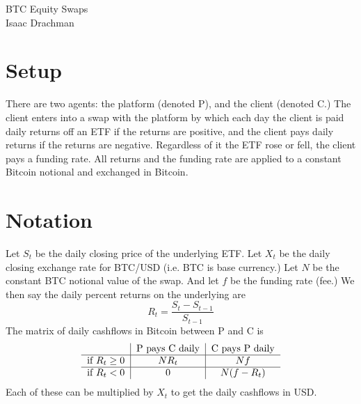 \documentclass[11pt]{report}
\begin{document}
\begingroup  
    \centering
    \Large BTC Equity Swaps\\
    \large Isaac Drachman\par
\endgroup

\section*{Setup}
    There are two agents: the platform (denoted P), and the client (denoted C.) The client
    enters into a swap with the platform by which each day the client is paid daily returns off an ETF
    if the returns are positive, and the client pays daily returns if the returns are negative. 
    Regardless of it the ETF rose or fell, the client pays a funding rate. All returns and the 
    funding rate are applied to a constant Bitcoin notional and exchanged in Bitcoin.
   
\section*{Notation}
    Let $S_t$ be the daily closing price of the underlying ETF. Let $X_t$ be the daily
    closing exchange rate for BTC/USD (i.e. BTC is base currency.) Let $N$ be the constant BTC 
    notional value of the swap. And let $f$ be the funding rate (fee.) We then say the daily
    percent returns on the underlying are
    \[
    R_t = \frac{S_t - S_{t-1}}{S_{t-1}}
    \]
    The matrix of daily cashflows in Bitcoin between P and C is
    \[
    \begin{tabular}{c|c|c}
    & P pays C daily & C pays P daily \\
    \hline
    if $R_t \geq 0$ & $NR_t$ & $Nf$ \\
    \hline
    if $R_t < 0$ & 0 & $N(f - R_t)$
    \end{tabular}
    \]
    Each of these can be multiplied by $X_t$ to get the daily cashflows in USD.
    
\end{document}
